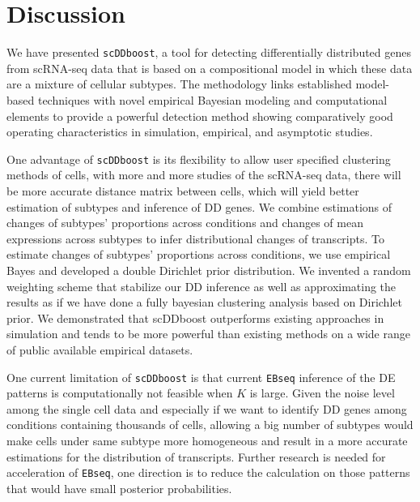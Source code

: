 \documentclass[aoas,preprint]{imsart}
\begin{document}
\section{Discussion}
We have presented \verb+scDDboost+,  a tool for
 detecting differentially distributed genes from scRNA-seq data that is based on a compositional model
in which these data are a mixture of cellular subtypes.  The methodology links established model-based
techniques with novel empirical Bayesian 
 modeling and computational elements to  provide a powerful detection method showing 
comparatively good operating characteristics in simulation, empirical, and asymptotic studies.

 One advantage of \verb+scDDboost+ is its flexibility to allow user 
specified clustering methods of cells, with more and more studies of the scRNA-seq data, there will be more accurate distance matrix between cells, which will yield better estimation of subtypes and inference of DD genes. We combine estimations of changes of subtypes' proportions across conditions and changes of mean expressions across subtypes to infer distributional changes of transcripts. To estimate changes of subtypes' proportions across conditions, we use empirical Bayes and developed a double Dirichlet prior distribution.  We invented a random weighting scheme that stabilize our DD inference as well as approximating the results as if we have done a fully bayesian clustering analysis based on Dirichlet prior.  We demonstrated that scDDboost outperforms existing approaches in simulation and tends to be more powerful than existing methods on a wide range of public available empirical datasets.   

One current limitation of \verb+scDDboost+ is that current \verb+EBseq+ 
inference of the DE patterns is computationally not feasible when $K$ is large. 
Given the noise level among the single cell data and especially if we want to identify DD genes among conditions containing thousands of cells, allowing a big number of subtypes would make cells under same subtype more homogeneous and result in a more accurate estimations for the distribution of transcripts. Further research is needed for acceleration of \verb+EBseq+, 
one direction is to reduce the calculation on those patterns that would have small posterior probabilities. 




%


\end{document}
